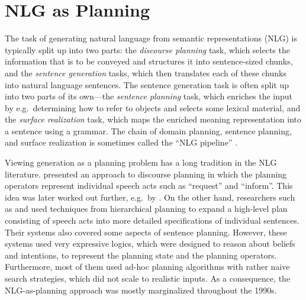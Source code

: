 \section{NLG as Planning} \label{sec:nlg-as-planning}

The task of generating natural language from semantic representations
(NLG) is typically split up into two parts: the \emph{discourse
  planning} task, which selects the information that is to be conveyed
and structures it into sentence-sized chunks, and the \emph{sentence
  generation} tasks, which then translates each of these chunks into
natural language sentences. The sentence generation task is often
split up into two parts of its own---the \emph{sentence planning}
task, which enriches the input by e.g.\ determining how to refer to
objects and selects some lexical material, and the \emph{surface
  realization} task, which maps the enriched meaning representation
into a sentence using a grammar. The chain of domain planning,
sentence planning, and surface realization is sometimes called the
``NLG pipeline'' \cite{reiter00building}.

Viewing generation as a planning problem has a long tradition in the
NLG literature.  \citet{perrault80} presented an approach to discourse
planning in which the planning operators represent individual speech
acts such as ``request'' and ``inform''. This idea was later worked
out further, e.g.\ by \citet{young94dpocl}. On the other hand,
researchers such as \citet{appelt:planning} and \citet{hovy88} used
techniques from hierarchical planning to expand a high-level plan
consisting of speech acts into more detailed specifications of
individual sentences. Their systems also covered some aspects of
sentence planning. However, these systems used very expressive logics,
which were designed to reason about beliefs and intentions, to
represent the planning state and the planning operators. Furthermore,
most of them used ad-hoc planning algorithms with rather naive search
strategies, which did not scale to realistic inputs. As a consequence,
the NLG-as-planning approach was mostly marginalized throughout the
1990s.

